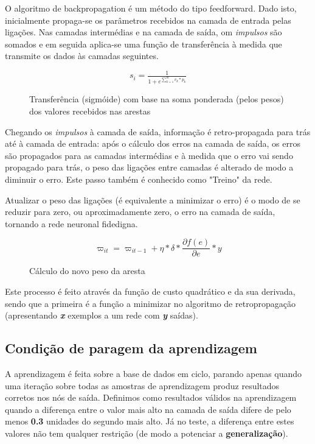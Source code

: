 \documentclass[10pt,a4paper]{article}
\begin{document}
O algoritmo de backpropagation é um método do tipo feedforward.
Dado isto, inicialmente propaga-se os parâmetros recebidos na camada de entrada pelas ligações. Nas camadas intermédias e na camada de saída, om \textit{impulsos} são somados e em seguida aplica-se uma função de transferência à medida que transmite os dados às camadas seguintes.

\begin{figure}[here]
\centering
\[s_{i} = \tfrac{1}{1 + e^{\sum_{k=1}^{m}v_{k} * p_{k}}}\]
\caption{Transferência (sigmóide) com base na soma ponderada (pelos pesos) dos valores recebidos nas arestas}
\end{figure}

Chegando os \textit{impulsos} à camada de saída, informação é retro-propagada para trás até à camada de entrada: após o cálculo dos erros na camada de saída, os erros são propagados para as camadas intermédias e à medida que o erro vai sendo propagado para trás, o peso das ligações entre camadas é alterado de modo a diminuir o erro. Este passo também é conhecido como "Treino" da rede.

Atualizar o peso das ligações (é equivalente a minimizar o erro) é o modo de se reduzir para zero, ou aproximadamente zero, o erro na camada de saída, tornando a rede neuronal fidedigna.

\begin{figure}[here]
\centering
\[\varpi _{it} = \varpi _{it - 1} + \eta * \delta * \frac{\partial f(e)}{\partial e}*y\]
\caption{Cálculo do novo peso da aresta}
\end{figure}

Este processo é feito através da função de custo quadrático e da sua derivada, sendo que a primeira é a função a minimizar no algoritmo de retropropagação (apresentando \textbf{\textit{x}} exemplos a um rede com \textbf{\textit{y}} saídas).


\subsection{Condição de paragem da aprendizagem}

A aprendizagem é feita sobre a base de dados em ciclo, parando apenas quando uma iteração sobre todas as amostras de aprendizagem produz resultados corretos nos nós de saída. Definimos como resultados válidos na aprendizagem quando a diferença entre o valor mais alto na camada de saída difere de pelo menos \textbf{0.3} unidades do segundo mais alto.
Já no teste, a diferença entre estes valores não tem qualquer restrição (de modo a potenciar a \textbf{generalização}).
\end{document}
